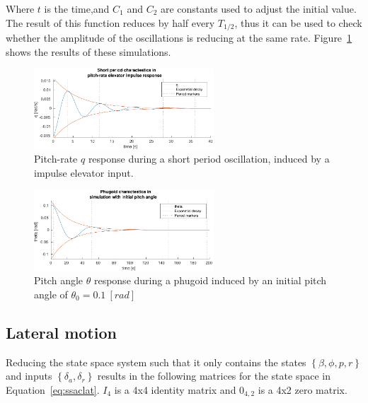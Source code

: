 Where $t$ is the time,and $C_1$ and $C_2$ are constants used to adjust the initial value. The result of this function reduces by half every $T_{1/2}$, thus it can be used to check whether the amplitude of the oscillations is reducing at the same rate. Figure~\ref{fig:ol_sp} shows the results of these simulations.

\begin{figure}[ht]
    \centering
    \includegraphics[width=0.6\textwidth]{figures/ol_sp}    
    \caption{Pitch-rate $q$ response during a short period oscillation, induced by a impulse elevator input.}
    \label{fig:ol_sp}
\end{figure}

\begin{figure}[ht]
    \centering
    \includegraphics[width=0.6\textwidth]{figures/ol_ph}    
    \caption{Pitch angle $\theta$ response during a phugoid induced by an initial pitch angle of $\theta_0=0.1\ [rad]$}
    \label{fig:ol_ph}
\end{figure}

\subsection{Lateral motion}
Reducing the state space system such that it only contains the states $\left \{ \beta, \phi, p, r \right \}$ and inputs $\left \{ \delta_{a}, \delta_{r} \right \}$ results in the following matrices for the state space in Equation~\ref{eq:ssaclat}. $I_4$ is a 4x4 identity matrix and $0_{4,2}$ is a 4x2 zero matrix.


